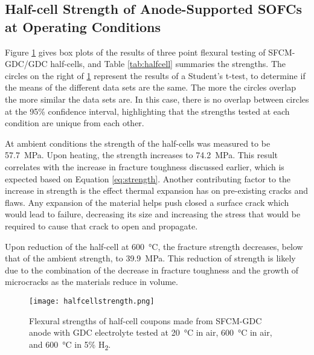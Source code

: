     \subsection{Half-cell Strength of Anode-Supported SOFCs at Operating Conditions}
        Figure \ref{fig:InSituBox} gives box plots of the results of three point flexural testing of SFCM-GDC/GDC half-cells, and Table \ref{tab:halfcell} summaries the strengths.
        The circles on the right of \ref{fig:InSituBox} represent the results of a Student's t-test, to determine if the means of the different data sets are the same.
        The more the circles overlap the more similar the data sets are.
        In this case, there is no overlap between circles at the 95\% confidence interval, highlighting that the strengths tested at each condition are unique from each other.

        At ambient conditions the strength of the half-cells was measured to be \SI{57.7}{\mega\pascal}.
        Upon heating, the strength increases to \SI{74.2}{\mega\pascal}.
        This result correlates with the increase in fracture toughness discussed earlier, which is expected based on Equation \ref{eq:strength}.
        Another contributing factor to the increase in strength is the effect thermal expansion has on pre-existing cracks and flaws.
        Any expansion of the material helps push closed a surface crack which would lead to failure, decreasing its size and increasing the stress that would be required to cause that crack to open and propagate.

        Upon reduction of the half-cell at \SI{600}{\celsius}, the fracture strength decreases, below that of the ambient strength, to \SI{39.9}{\mega\pascal}.
        This reduction of strength is likely due to the combination of the decrease in fracture toughness and the growth of microcracks as the materials reduce in volume.

        \begin{figure}
          \texttt{[image: halfcellstrength.png]}
          \caption{Flexural strengths of half-cell coupons made from SFCM-GDC anode with GDC electrolyte tested at \SI{20}{\celsius} in air, \SI{600}{\celsius} in air, and \SI{600}{\celsius} in 5\% H\textsubscript{2}.}
          \label{fig:InSituBox}
        \end{figure}

